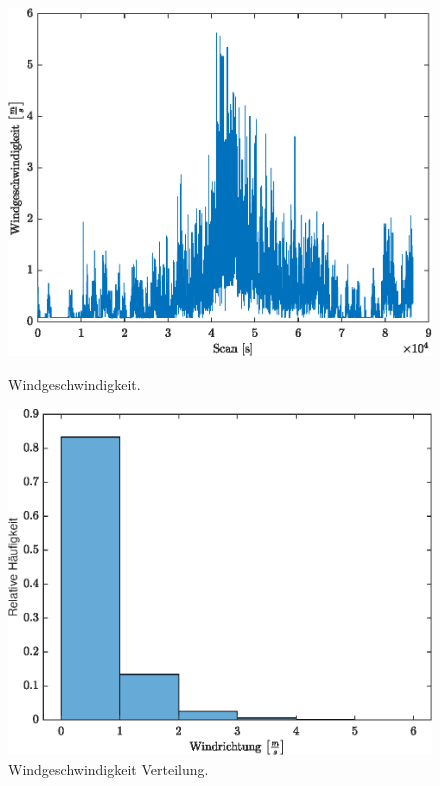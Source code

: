 \begin{figure}[H]
	\centering
	\begin{minipage}[t]{0.45\textwidth}
	\centering
	\includegraphics[width=\textwidth]{../DATA/Windgeschwindigkeit.eps}
	\caption[Windgeschwindigkeit]{Windgeschwindigkeit.}
	\label{fig:windspd}
	\end{minipage}
\hfill
	\begin{minipage}[t]{0.45\textwidth}
	\centering
	\includegraphics[width=\textwidth]{../DATA/WindspdCN.eps}
	\caption[Windgeschwindigkeit Verteilung]{Windgeschwindigkeit Verteilung.}
	\label{fig:windspdCN}
	\end{minipage}
\end{figure}
